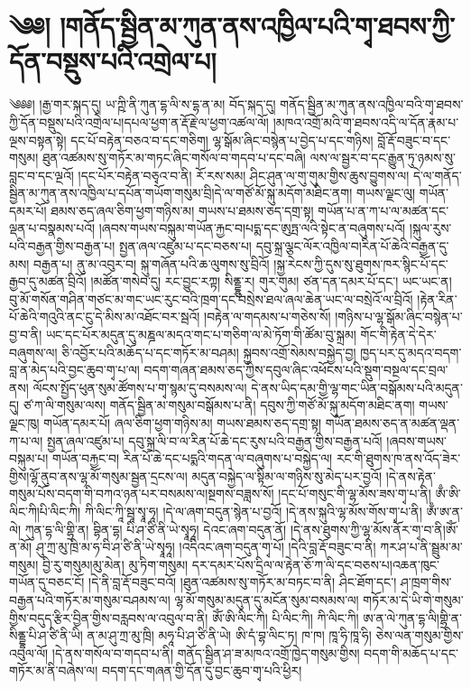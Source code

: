 \chapter{༄༅། །གནོད་སྦྱིན་མ་ཀུན་ནས་འཁྱིལ་པའི་གྭ་ཐབས་ཀྱི་དོན་བསྡུས་པའི་འགྲེལ་པ། }༄༅༅། །རྒྱ་གར་སྐད་དུ། ཡ་ཀྵི་ནི་ཀུན་དྷ་ལི་ས་དྷ་ན་མ། བོད་སྐད་དུ། གནོད་སྦྱིན་མ་ཀུན་ནས་འཁྱིལ་བའི་གྭ་ཐབས་ཀྱི་དོན་བསྡུས་པའི་འགྲེལ་པ།དཔལ་ཕྱག་ན་རྡོ་རྗེ་ལ་ཕྱག་འཚལ་ལོ། །མཁའ་འགྲོ་མའི་གྭ་ཐབས་འདི་ལ་དོན་རྣམ་པ་ལྔས་བསྟན་སྟེ། དང་པོ་བརྟེན་བཅའ་བ་དང་གཅིག། ལྷ་སྒོམ་ཞིང་བསྙེན་པ་བྱེད་པ་དང་གཉིས། བློ་རྡོ་བཟུང་བ་དང་གསུམ། ཐུན་འཚམས་སུ་གཏོར་མ་གཏང་ཞིང་གསོལ་བ་གདབ་པ་དང་བཞི། ལས་ལ་སྦྱར་བ་དང་རྒྱུན་ཏུ་ཉམས་སུ་བླང་བ་དང་ལྔའོ། །དང་པོར་བརྟེན་བཅྭའ་བ་ནི། རོ་རས་སམ། ཤིང་ཤུན་ལ་གུ་གུམ་གྱིས་ཆུས་བྱུགས་ལ། དེ་ལ་གནོད་སྦྱིན་མ་ཀུན་ནས་འཁྱིལ་པ་དཔོན་གཡོག་གསུམ་བྲི།དེ་ལ་གཙོ་མོ་སྐུ་མདོག་མཐིང་ནག། གཡས་ལྗང་ལུ། གཡོན་དམར་པོ། ཐམས་ཅད་ཞལ་ཅིག་ཕྱག་གཉིས་མ། གཡས་པ་ཐམས་ཅད་དགྲ་སྟ། གཡོན་པ་ན་ཀ་པ་ལ་མཚན་དང་ལྡན་པ་བསྣམས་པའོ། །ཞབས་གཡས་བསྐུམ་གཡོན་རྐྱང་བ།པདྨ་དང་ཨུཏྤ་ལའི་སྟེང་ན་བཞུགས་པའོ། །སྐུལ་རུས་པའི་བརྒྱན་གྱིས་བརྒྱན་པ། སྤྱན་ཞལ་འཛུམ་པ་དང་བཅས་པ། དབུ་སྐྲ་ལྕང་ལོར་འཁྱིལ་བ།རིན་པོ་ཆེའི་བརྒྱན་དུ་མས། བརྒྱན་པ། ནུ་མ་འབུར་བ། སྐུ་གཞོན་པའི་ཆ་ལུགས་སུ་བྲིའོ། །སྐྱ་རེངས་ཀྱི་དུས་སུ་ཐུགས་ཁར་སྙིང་པོ་དང་རྒྱབ་དུ་མཚན་བྲིའོ། །མཚོན་གསེབ་དུ། རང་བྱུང་རཀྟ། སིནྡྷུ་ར། གུར་གུམ། ཙན་དན་དམར་པོ་དང་། ཡང་ཡང་ན། བུ་མོ་གསོན་གཤིན་གཙང་མ་གང་ཡང་རུང་བའི་ཁྲག་དང་བསྲེས་ཐལ་ཞལ་ཆེན་ཡང་ལ་བསྲེའོ་ལ་བྲིའོ། །རྟེན་རིན་པོ་ཆེའི་གའུའི་ནང་ངུ་དེ་མིས་མ་འཐོང་བར་སྦའོ། །བརྟེན་ལ་གདམས་པ་གཅེས་སོ། །གཉིས་པ་ལྷ་སྒོམ་ཞིང་བསྙེན་པ་བྱ་བ་ནི། ཡང་དང་པོར་མདུན་དུ་མཎྜལ་མདའ་གང་པ་གཅིག་ལ་མེ་ཏོག་གི་ཚོམ་བུ་སྐྲམ། གོང་གི་རྟེན་དེ་དེར་བཞུགས་ལ། ཅི་འབྱོར་པའི་མཆོད་པ་དང་གཏོར་མ་བཤམ། སྐྱབས་འགྲོ་སེམས་བསྐྱེད་བྱ། ཁྱད་པར་དུ་མདའ་བདག་བླ་ན་མེད་པའི་བྱང་ཆུབ་གྭ་པ་ལ། བདག་གཞན་ཐམས་ཅད་ཀྱིས་དབུལ་ཞིང་འཕོངས་པའི་སྡུག་བསྔལ་དང་བྲལ་ནས། ལོངས་སྤྱོད་ཕུན་སུམ་ཚོགས་པ་གྭ་སྙམ་དུ་བསམས་ལ། དེ་ནས་ཡིད་དམ་གྱི་ལྷ་གང་ཡིན་བསྒོམས་པའི་མདུན་དུ། ཙ་ཀ་ལི་གསུམ་ལས། གནོད་སྦྱིན་མ་གསུམ་བསྒོམས་པ་ནི། དབུས་ཀྱི་གཙོ་མོ་སྐུ་མདོག་མཐིང་ནག། གཡས་ལྗང་ཁུ། གཡོན་དམར་པོ། ཞལ་ཅིག་ཕྱག་གཉིས་མ། གཡས་ཐམས་ཅད་དགྲ་སྟ། གཡོན་ཐམས་ཅད་ན་མཚན་ལྡན་ཀ་པ་ལ། སྤྱན་ཞལ་འཛུམ་པ། དབུ་སྐྲ་ལི་བ་ལ་རིན་པོ་ཆེ་དང་རུས་པའི་བརྒྱན་གྱིས་བརྒྱན་པའོ། །ཞབས་གཡས་བསྐུམ་པ། གཡོན་བརྐྱང་བ། རིན་པོ་ཆེ་དང་པདྨའི་གདན་ལ་བཞུགས་པ་བསྐྱེད་ལ། རང་གི་ཐུགས་ཁ་ནས་འོད་ཟེར་གྱིས།ལྷོ་ནུབ་ནས་ལྷ་མོ་གསུམ་སྦྱན་དྲངས་ལ། མདུན་བསྐྱེད་ལ་སྟིམ་ལ་གཉིས་སུ་མེད་པར་བྱའོ། །དེ་ནས་རྟེན་གསུམ་པོས་བདག་གི་བཀའ་ཉན་པར་བསམས་ལ།སྔགས་བཟླས་སོ། །དང་པོ་གསུང་གི་ལྷ་མོས་ཟས་གྭ་པ་ནི། ཨྃ་ཨི་ལིང་ཀི།པི་ལིང་ཀི། ཀི་ལིང་ཀཱི་སྦཱ་སྭཱ་ཧཱ། །དེ་ལ་ཞག་བདུན་སྙེན་པ་བྱའོ། །དེ་ནས་སྐུའི་ལྷ་མོས་གོས་གྭ་པ་ནི། ཨྃ་ཨ་ན་ལེ། ཀུན་དྷ་ལི་གྷྲི་ན། བྷིན་དྷ། པི་ཤ་ཙི་ནི་ཡེ་སྭཱཧཱ། དེའང་ཞག་བདུན་ནོ། །དེ་ནས་ཐུགས་ཀྱི་ལྷ་མོས་ནོར་གྭ་བ་ནི།ཨོཾ་ན་མོ། ཤུ་ཀྲ་མུ་ཁྲི་མ་ཧ་བི་ཤ་ཙི་ནི་ཡེ་སྭཱཧཱ། །འདིའང་ཞག་བདུན་གྭ་པོ། །དེའི་བླ་རྡོ་བཟུང་བ་ནི། ཀར་ཤ་པ་ནི་སྦྲུམ་མ་གསུམ། བྱི་རུ་གསུམ།མུ་མེན། མུ་ཏིག་གསུམ། དར་དམར་པོས་དྲིལ་ལ་རྟེན་ཅོ་ཀ་ལི་དང་བཅས་པ།འཆན་ཁུང་གཡོན་དུ་བཅང་ངོ། །དེ་ནི་བླ་རྡོ་བཟུང་བའོ། །ཐུན་འཚམས་སུ་གཏོར་མ་བཏང་བ་ནི། ཤིང་ཐོག་དང་། ཤ་ཁྲག་གིས་བརྒྱན་པའི་གཏོར་མ་གསུམ་བཤམས་ལ། ལྷ་མོ་གསུམ་མདུན་དུ་མངོན་སུམ་བསམས་ལ། གཏོར་མ་དེ་ཡི་གེ་གསུམ་གྱིས་བདུད་རྩིར་བྱིན་གྱིས་བརླབས་ལ་འབུལ་བ་ནི། ཨོཾ་ཨི་ལིང་ཀི། པི་ལིང་ཀི། ཀི་ལིང་ཀི། ཨ་ན་ལེ་ཀུན་དྷ་ལི།གྷྲི་ན་སིནྡྷ་པི་ཤ་ཙི་ནི་ཡི། ན་མ་ཤུ་ཀྲ་མུ་ཁྲི། མཧཱ་པི་ཤ་ཙི་ནི་ཡེ། ཨི་དཾ་བྷ་ལིང་ཏ། ཁ་ཁ། ཁཱ་ཧི་ཁཱ་ཧི། ཅེས་ལན་གསུམ་གྱིས་འབུལ་ལོ། །དེ་ནས་གསོལ་བ་གདབ་པ་ནི། གནོད་སྦྱིན་ཤ་ཟ་མཁའ་འགྲོ་ཁྱེད་གསུམ་གྱིས། བདག་གི་མཆོད་པ་དང་གཏོར་མ་ནི་བཞེས་ལ། བདག་དང་གཞན་གྱི་དོན་དུ་བྱང་ཆུབ་གྭ་པའི་ཕྱིར། 